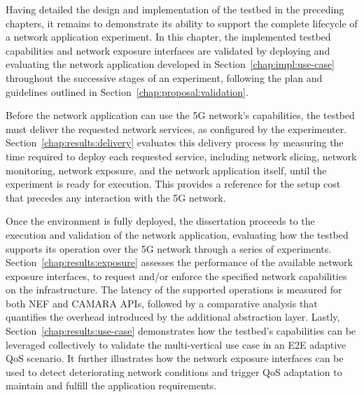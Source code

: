 Having detailed the design and implementation of the testbed in the preceding chapters, it remains to demonstrate its ability to support the complete lifecycle of a network application experiment. In this chapter, the implemented testbed capabilities and network exposure interfaces are validated by deploying and evaluating the network application developed in Section~\ref{chap:impl:use-case} throughout the successive stages of an experiment, following the plan and guidelines outlined in Section~\ref{chap:proposal:validation}.

Before the network application can use the \acs{5G} network's capabilities, the testbed must deliver the requested network services, as configured by the experimenter. Section~\ref{chap:results:delivery} evaluates this delivery process by measuring the time required to deploy each requested service, including network slicing, network monitoring, network exposure, and the network application itself, until the experiment is ready for execution. This provides a reference for the setup cost that precedes any interaction with the \acs{5G} network.

Once the environment is fully deployed, the dissertation proceeds to the execution and validation of the network application, evaluating how the testbed supports its operation over the \acs{5G} network through a series of experiments. Section~\ref{chap:results:exposure} assesses the performance of the available network exposure interfaces, to request and/or enforce the specified network capabilities on the infrastructure. The latency of the supported operations is measured for both \acs{NEF} and CAMARA \acsp{API}, followed by a comparative analysis that quantifies the overhead introduced by the additional abstraction layer. Lastly, Section~\ref{chap:results:use-case} demonstrates how the testbed's capabilities can be leveraged collectively to validate the multi-vertical use case in an \acs{E2E} adaptive \acs{QoS} scenario. It further illustrates how the network exposure interfaces can be used to detect deteriorating network conditions and trigger \acs{QoS} adaptation to maintain and fulfill the application requirements.

